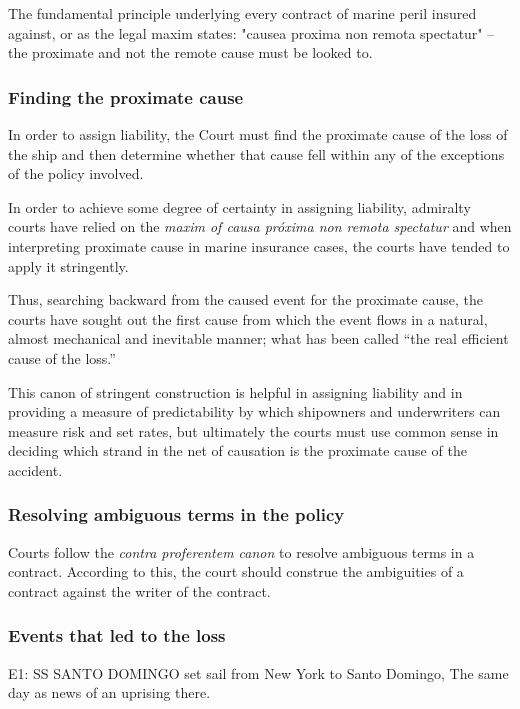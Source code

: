 The fundamental principle underlying every contract of marine peril insured against, or as the legal maxim states: "causea proxima non remota spectatur" -- the proximate and not the remote cause must be looked to. \cite{marineInsuranceAct55}

\subsubsection{Finding the proximate cause}

In order to assign liability, the Court must find the proximate cause of the loss of the ship and then
determine whether that cause fell within any of the exceptions of the policy involved.

In order to achieve some degree of certainty in assigning liability,
admiralty courts have relied on the \textit{maxim of causa próxima non remota spectatur}
and when interpreting  proximate cause in marine insurance cases, the courts have
tended to apply it stringently.

Thus, searching backward from the
caused event for the proximate cause, the courts have sought out the first cause
from which the event flows in a natural, almost mechanical and inevitable manner;
what has been called “the real efficient cause of the loss.”

This canon of stringent construction is helpful in assigning
liability and in providing a measure of predictability by which shipowners and
underwriters can measure risk and set rates, but ultimately the courts must use common sense in deciding which strand in the net of causation is the proximate cause of the accident.

\subsubsection{Resolving ambiguous terms in the policy}

Courts follow the \textit{contra proferentem canon} to resolve ambiguous terms in a contract. According to this, the court should construe the ambiguities of a contract against the writer of the contract. 

\subsubsection{Events that led to the loss}

E1: SS SANTO DOMINGO set sail from New York to Santo Domingo, The same day as news of an uprising there.

